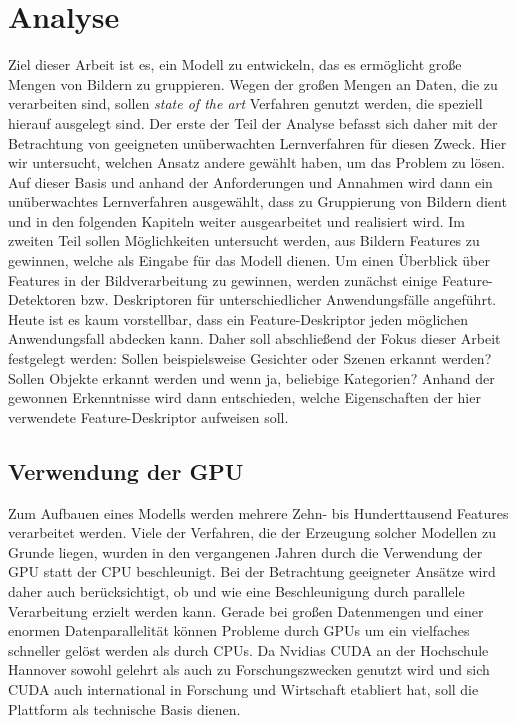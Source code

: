 \chapter{Analyse}

Ziel dieser Arbeit ist es, ein Modell zu entwickeln, das es ermöglicht große Mengen von Bildern zu gruppieren. Wegen der großen Mengen an Daten, die zu verarbeiten sind, sollen \textit{state of the art} Verfahren genutzt werden, die speziell hierauf ausgelegt sind. Der erste der Teil der Analyse befasst sich daher mit der Betrachtung von geeigneten unüberwachten Lernverfahren für diesen Zweck. Hier wir untersucht, welchen Ansatz andere gewählt haben, um das Problem zu lösen. Auf dieser Basis und anhand der Anforderungen und Annahmen wird dann ein unüberwachtes Lernverfahren ausgewählt, dass zu Gruppierung von Bildern dient und in den folgenden Kapiteln weiter ausgearbeitet und realisiert wird. \newline
Im zweiten Teil sollen Möglichkeiten untersucht werden, aus Bildern Features zu gewinnen, welche als Eingabe für das Modell dienen. Um einen Überblick über Features in der Bildverarbeitung zu gewinnen, werden zunächst einige Feature-Detektoren bzw. Deskriptoren für unterschiedlicher Anwendungsfälle angeführt. Heute ist es kaum vorstellbar, dass ein Feature-Deskriptor jeden möglichen Anwendungsfall abdecken kann. Daher soll abschließend der Fokus dieser Arbeit festgelegt werden: Sollen beispielsweise Gesichter oder Szenen erkannt werden? Sollen Objekte erkannt werden und wenn ja, beliebige Kategorien? Anhand der gewonnen Erkenntnisse wird dann entschieden, welche Eigenschaften der hier verwendete Feature-Deskriptor aufweisen soll. 

\section{Verwendung der GPU}

Zum Aufbauen eines Modells werden mehrere Zehn- bis Hunderttausend Features verarbeitet werden. Viele der Verfahren, die der Erzeugung solcher Modellen zu Grunde liegen, wurden in den vergangenen Jahren durch die Verwendung der GPU statt der CPU beschleunigt. Bei der Betrachtung geeigneter Ansätze wird daher auch berücksichtigt, ob und wie eine Beschleunigung durch parallele Verarbeitung erzielt werden kann. Gerade bei großen Datenmengen und einer enormen Datenparallelität können Probleme durch GPUs um ein vielfaches schneller gelöst werden als durch CPUs. Da Nvidias CUDA an der Hochschule Hannover sowohl gelehrt als auch zu Forschungszwecken genutzt wird und sich CUDA auch international in Forschung und Wirtschaft etabliert hat, soll die Plattform als technische Basis dienen. 

